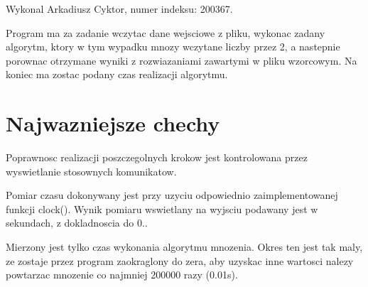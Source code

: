 \-Wykonal \-Arkadiusz \-Cyktor, numer indeksu\-: 200367.

\-Program ma za zadanie wczytac dane wejsciowe z pliku, wykonac zadany algorytm, ktory w tym wypadku mnozy wczytane liczby przez 2, a nastepnie porownac otrzymane wyniki z rozwiazaniami zawartymi w pliku wzorcowym. \-Na koniec ma zostac podany czas realizacji algorytmu.\hypertarget{index_etykieta-Wazne-cechy}{}\section{\-Najwazniejsze chechy}\label{index_etykieta-Wazne-cechy}
\-Poprawnosc realizacji poszczegolnych krokow jest kontrolowana przez wyswietlanie stosownych komunikatow.

\-Pomiar czasu dokonywany jest przy uzyciu odpowiednio zaimplementowanej funkcji clock(). \-Wynik pomiaru wswietlany na wyjsciu podawany jest w sekundach, z dokladnoscia do 0..

\-Mierzony jest tylko czas wykonania algorytmu mnozenia. \-Okres ten jest tak maly, ze zostaje przez program zaokraglony do zera, aby uzyskac inne wartosci nalezy powtarzac mnozenie co najmniej 200000 razy (0.\-01s). 